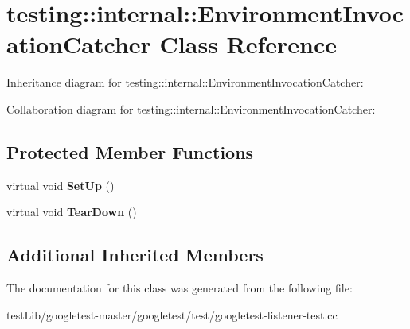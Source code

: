 \hypertarget{classtesting_1_1internal_1_1EnvironmentInvocationCatcher}{}\section{testing\+:\+:internal\+:\+:Environment\+Invocation\+Catcher Class Reference}
\label{classtesting_1_1internal_1_1EnvironmentInvocationCatcher}


Inheritance diagram for testing\+:\+:internal\+:\+:Environment\+Invocation\+Catcher\+:


Collaboration diagram for testing\+:\+:internal\+:\+:Environment\+Invocation\+Catcher\+:
\subsection*{Protected Member Functions}
\begin{DoxyCompactItemize}
\item 
\mbox{\label{classtesting_1_1internal_1_1EnvironmentInvocationCatcher_a325365b0ecfa71a4a767d7a1817c9663}} 
virtual void {\bfseries Set\+Up} ()
\item 
\mbox{\label{classtesting_1_1internal_1_1EnvironmentInvocationCatcher_afc89ee0a8e32e6746a89fcc1682f62e9}} 
virtual void {\bfseries Tear\+Down} ()
\end{DoxyCompactItemize}
\subsection*{Additional Inherited Members}


The documentation for this class was generated from the following file\+:\begin{DoxyCompactItemize}
\item 
test\+Lib/googletest-\/master/googletest/test/googletest-\/listener-\/test.\+cc\end{DoxyCompactItemize}
